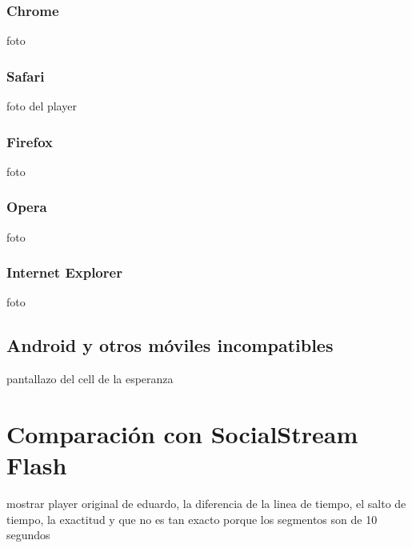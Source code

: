     \subsubsection{Chrome}
    foto
    \subsubsection{Safari}
    foto del player
    \subsubsection{Firefox}
    foto
    \subsubsection{Opera}
    foto
    \subsubsection{Internet Explorer}
    foto
  \subsection{Android y otros móviles incompatibles}
  pantallazo del cell de la esperanza
\section{Comparación con SocialStream Flash}
mostrar player original de eduardo, la diferencia de la linea de tiempo, el salto de tiempo, la exactitud y que no es tan exacto porque los segmentos son de 10 segundos

